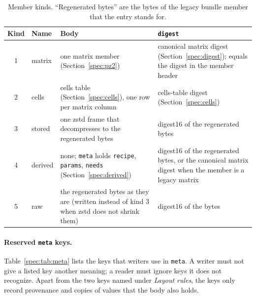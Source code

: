 \begin{table}[htbp]
\centering\footnotesize\setlength{\tabcolsep}{4pt}
\caption{Member kinds. ``Regenerated bytes'' are the bytes of the legacy bundle member that the entry stands for.}
\label{spec:tab:kinds}
\begin{tabularx}{\linewidth}{@{}clXX@{}}
\toprule
Kind & Name & Body & \texttt{digest} \\
\midrule
1 & matrix  & one matrix member (Section~\ref{spec:pz2}) & canonical matrix digest (Section~\ref{spec:digest}); equals the digest in the member header \\
2 & cells   & cells table (Section~\ref{spec:cells}), one row per matrix column & cells-table digest (Section~\ref{spec:cells}) \\
3 & stored  & one zstd frame that decompresses to the regenerated bytes & digest16 of the regenerated bytes \\
4 & derived & none; \texttt{meta} holds \texttt{recipe}, \texttt{params}, \texttt{needs} (Section~\ref{spec:derived}) & digest16 of the regenerated bytes, or the canonical matrix digest when the member is a legacy matrix \\
5 & raw     & the regenerated bytes as they are (written instead of kind 3 when zstd does not shrink them) & digest16 of the bytes \\
\bottomrule
\end{tabularx}
\end{table}

\paragraph{Reserved \texttt{meta} keys.}
Table~\ref{spec:tab:meta} lists the keys that writers use in \texttt{meta}. A writer must not give a listed key another
meaning; a reader must ignore keys it does not recognize. Apart from the two keys named under \emph{Layout rules}, the keys
only record provenance and copies of values that the body also holds.

